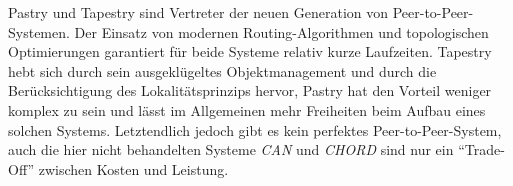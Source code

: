 Pastry und Tapestry sind Vertreter der neuen Generation von 
Peer-to-Peer-Systemen. Der Einsatz von modernen Routing-Algorithmen und 
topologischen Optimierungen garantiert für beide Systeme relativ kurze 
Laufzeiten. Tapestry hebt sich durch sein ausgeklügeltes Objektmanagement und 
durch die Berücksichtigung des Lokalitätsprinzips hervor, Pastry hat den 
Vorteil weniger komplex zu sein und lässt im Allgemeinen mehr Freiheiten beim 
Aufbau eines solchen Systems. Letztendlich jedoch gibt es kein perfektes 
Peer-to-Peer-System, auch die hier nicht behandelten Systeme \textsl{CAN} und 
\textsl{CHORD} sind nur ein "`Trade-Off"' zwischen Kosten und Leistung.
